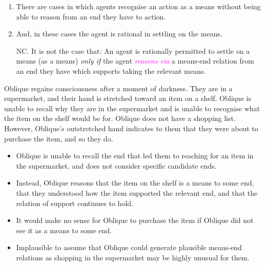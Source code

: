 \documentclass[10pt]{article}
\newcommand{\hozlinedash}[0]{%
  \noindent\hdashrule[0.5ex][c]{\textwidth}{.1pt}{2.5pt}
}
\begin{document}
\hozlinedash

\begin{enumerate}[label=N\arabic*., ref=(N\arabic*)]
\item There are cases in which agents recognise an action as a means without being able to reason from an end they have to action.
\item And, in these cases the agent is rational in settling on the means.
\item[NC.] It is not the case that:
  An agent is rationally permitted to settle on a means (as a means)  \emph{only if} the agent \textcolor{fuchsia}{\emph{reasons via}} a means-end relation from an end they have which supports taking the relevant means.
\end{enumerate}

\hozlinedash

\begin{scenario}[Supermarket]
  Oblique regains consciousness after a moment of darkness.
  They are in a supermarket, and their hand is stretched toward an item on a shelf.
  Oblique is unable to recall why they are in the supermarket and is unable to recognise what the item on the shelf would be for.
  Oblique does not have a shopping list.
  However, Oblique's outstretched hand indicates to them that they were about to purchase the item, and so they do.
\end{scenario}


\begin{itemize}
\item Oblique is unable to recall the end that led them to reaching for an item in the supermarket, and does not consider specific candidate ends.
\item Instead, Oblique reasons that the item on the shelf is a means to some end, that they understood how the item supported the relevant end, and that the relation of support continues to hold.
\item It would make no sense for Oblique to purchase the item if Oblique did not see it as a means to some end.
\item Implausible to assume that Oblique could generate plausible means-end relations as shopping in the supermarket may be highly unusual for them.
\end{itemize}




\hozlinedash
\end{document}

